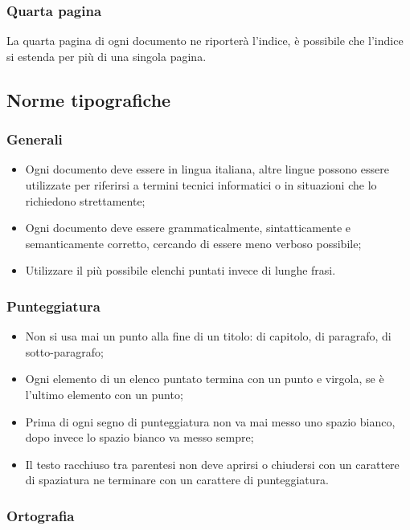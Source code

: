 \subsubsection{Quarta pagina}
La quarta pagina di ogni documento ne riporterà l'indice, è possibile che l'indice si estenda per più di una singola pagina. 

\subsection{Norme tipografiche}
\subsubsection{Generali}
\begin{itemize}
\item Ogni documento deve essere in lingua italiana, altre lingue possono essere utilizzate per riferirsi a termini tecnici informatici o in situazioni che lo richiedono strettamente;

\item Ogni documento deve essere grammaticalmente, sintatticamente e semanticamente corretto, cercando di essere meno verboso possibile;

\item Utilizzare il più possibile elenchi puntati invece di lunghe frasi.

\end{itemize}
\subsubsection{Punteggiatura}
\begin{itemize}
\item Non si usa mai un punto alla fine di un titolo: di capitolo, di paragrafo, di sotto-paragrafo;

\item Ogni elemento di un elenco puntato termina con un punto e virgola, se è l'ultimo elemento con un punto;

\item Prima di ogni segno di punteggiatura non va mai messo uno spazio bianco, dopo invece lo spazio bianco va messo sempre;


\item Il testo racchiuso tra parentesi non deve aprirsi o chiudersi con un carattere di spaziatura ne terminare con un carattere di punteggiatura.

\end{itemize}
\subsubsection{Ortografia}

